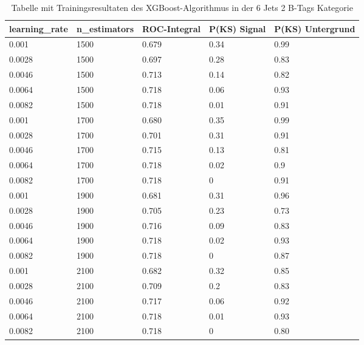 \begin{table}[tbp]\parbox{12cm}{
  \caption[XGBoost 6j2t Ergebnisse]{Tabelle mit Trainingsresultaten des XGBoost-Algorithmus in der 6 Jets 2 B-Tags Kategorie}%
  }\label{tab:xgboost_6j2t}
  \begin{center}
  \begin{tabular}{lllll}
  \hline
  learning\_rate & n\_estimators & ROC-Integral & P(KS) Signal & P(KS) Untergrund\\
  \hline
\num{0,001}  & \num{1500} & \num{0,679} & \num{0,34} & \num{0,99}\\
\num{0,0028} & \num{1500} & \num{0,697} & \num{0,28} & \num{0,83}\\
\num{0,0046} & \num{1500} & \num{0,713} & \num{0,14} & \num{0,82}\\
\num{0,0064} & \num{1500} & \num{0,718} & \num{0,06} & \num{0,93}\\
\num{0,0082} & \num{1500} & \num{0,718} & \num{0,01} & \num{0,91}\\
\num{0,001}  & \num{1700} & \num{0,680} & \num{0,35} & \num{0,99}\\
\num{0,0028} & \num{1700} & \num{0,701} & \num{0,31} & \num{0,91}\\
\num{0,0046} & \num{1700} & \num{0,715} & \num{0,13} & \num{0,81}\\
\num{0,0064} & \num{1700} & \num{0,718} & \num{0,02} & \num{0,9}\\
\num{0,0082} & \num{1700} & \num{0,718} & \num{0}    & \num{0,91}\\
\num{0,001}  & \num{1900} & \num{0,681} & \num{0,31} & \num{0,96}\\
\num{0,0028} & \num{1900} & \num{0,705} & \num{0,23} & \num{0,73}\\
\num{0,0046} & \num{1900} & \num{0,716} & \num{0,09} & \num{0,83}\\
\num{0,0064} & \num{1900} & \num{0,718} & \num{0,02} & \num{0,93}\\
\num{0,0082} & \num{1900} & \num{0,718} & \num{0}    & \num{0,87}\\
\num{0,001}  & \num{2100} & \num{0,682} & \num{0,32} & \num{0,85}\\
\num{0,0028} & \num{2100} & \num{0,709} & \num{0,2}  & \num{0,83}\\
\num{0,0046} & \num{2100} & \num{0,717} & \num{0,06} & \num{0,92}\\
\num{0,0064} & \num{2100} & \num{0,718} & \num{0,01} & \num{0,93}\\
\num{0,0082} & \num{2100} & \num{0,718} & \num{0}    & \num{0,80}\\

\end{tabular}
\end{center}
\end{table}
